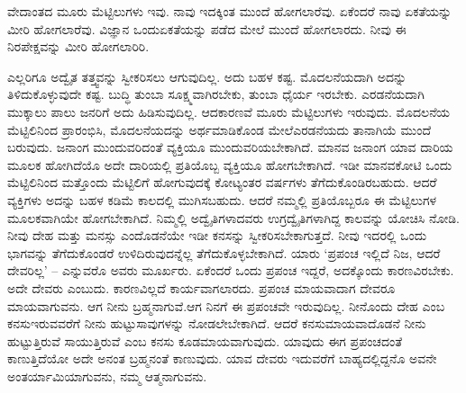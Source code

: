 ವೇದಾಂತದ ಮೂರು ಮೆಟ್ಟಿಲುಗಳು ಇವು. ನಾವು ಇದಕ್ಕಿಂತ ಮುಂದೆ ಹೋಗಲಾರೆವು. ಏಕೆಂದರೆ ನಾವು ಏಕತೆಯನ್ನು ಮೀರಿ ಹೋಗಲಾರೆವು. ವಿಜ್ಞಾನ ಒಂದು\break ಏಕತೆಯನ್ನು ಪಡೆದ ಮೇಲೆ ಮುಂದೆ ಹೋಗಲಾರದು. ನೀವು ಈ ನಿರಪೇಕ್ಷವನ್ನು ಮೀರಿ ಹೋಗಲಾರಿರಿ.

ಎಲ್ಲರಿಗೂ ಅದ್ವೈತ ತತ್ತ್ವವನ್ನು ಸ್ವೀಕರಿಸಲು ಆಗುವುದಿಲ್ಲ. ಅದು ಬಹಳ ಕಷ್ಟ. ಮೊದಲನೆಯದಾಗಿ ಅದನ್ನು ತಿಳಿದುಕೊಳ್ಳುವುದೇ ಕಷ್ಟ. ಬುದ್ಧಿ ತುಂಬಾ ಸೂಕ್ಷ್ಮವಾಗಿರಬೇಕು, ತುಂಬಾ ಧೈರ್ಯ ಇರಬೇಕು. ಎರಡನೆಯದಾಗಿ ಮುಕ್ಕಾಲು ಪಾಲು ಜನರಿಗೆ ಅದು ಹಿಡಿಸುವುದಿಲ್ಲ. ಆದಕಾರಣವೆ ಮೂರು ಮೆಟ್ಟಿಲುಗಳು ಇರುವುದು. ಮೊದಲನೆಯ ಮೆಟ್ಟಿಲಿನಿಂದ ಪ್ರಾರಂಭಿಸಿ, ಮೊದಲನೆಯದನ್ನು ಅರ್ಥಮಾಡಿಕೊಂಡ ಮೇಲೆ\break ಎರಡನೆಯದು ತಾನಾಗಿಯೆ ಮುಂದೆ ಬರುವುದು. ಜನಾಂಗ ಮುಂದುವರಿದಂತೆ ವ್ಯಕ್ತಿಯೂ ಮುಂದುವರಿಯಬೇಕಾಗಿದೆ. ಮಾನವ ಜನಾಂಗ ಯಾವ ದಾರಿಯ ಮೂಲಕ ಹೋಗಿದೆಯೊ ಅದೇ ದಾರಿಯಲ್ಲಿ ಪ್ರತಿಯೊಬ್ಬ ವ್ಯಕ್ತಿಯೂ ಹೋಗಬೇಕಾಗಿದೆ. ಇಡೀ ಮಾನವಕೋಟಿ ಒಂದು ಮೆಟ್ಟಿಲಿನಿಂದ ಮತ್ತೊಂದು ಮೆಟ್ಟಿಲಿಗೆ ಹೋಗುವುದಕ್ಕೆ ಕೋಟ್ಯಂತರ ವರ್ಷಗಳು ತೆಗೆದುಕೊಂಡಿರಬಹುದು. ಆದರೆ ವ್ಯಕ್ತಿಗಳು ಅದನ್ನು ಬಹಳ ಕಡಿಮೆ ಕಾಲದಲ್ಲಿ ಮುಗಿಸಬಹುದು. ಆದರೆ ನಮ್ಮಲ್ಲಿ ಪ್ರತಿಯೊಬ್ಬರೂ ಈ ಮೆಟ್ಟಿಲುಗಳ ಮೂಲಕವಾಗಿಯೇ ಹೋಗಬೇಕಾಗಿದೆ. ನಿಮ್ಮಲ್ಲಿ ಅದ್ವೈತಿಗಳಾದವರು ಉಗ್ರದ್ವೈತಿಗಳಾಗಿದ್ದ ಕಾಲವನ್ನು ಯೋಚಿಸಿ ನೋಡಿ. ನೀವು ದೇಹ ಮತ್ತು ಮನಸ್ಸು ಎಂದೊಡನೆಯೇ ಇಡೀ ಕನಸನ್ನು ಸ್ವೀಕರಿಸಬೇಕಾಗುತ್ತದೆ. ನೀವು ಇದರಲ್ಲಿ ಒಂದು ಭಾಗವನ್ನು ತೆಗೆದುಕೊಂಡರೆ ಉಳಿದಿರುವುದನ್ನೆಲ್ಲ ತೆಗೆದುಕೊಳ್ಳಬೇಕಾಗಿದೆ. ಯಾರು ‘ಪ್ರಪಂಚ ಇಲ್ಲಿದೆ ನಿಜ, ಆದರೆ ದೇವರಿಲ್ಲ’ – ಎನ್ನುವರೊ ಅವರು ಮೂರ್ಖರು. ಏಕೆಂದರೆ ಒಂದು ಪ್ರಪಂಚ ಇದ್ದರೆ, ಅದಕ್ಕೊಂದು ಕಾರಣವಿರಬೇಕು. ಅದೇ ದೇವರು ಎಂಬುದು. ಕಾರಣವಿಲ್ಲದೆ ಕಾರ್ಯವಾಗಲಾರದು. ಪ್ರಪಂಚ ಮಾಯವಾದಾಗ ದೇವರೂ ಮಾಯವಾಗುವನು. ಆಗ ನೀನು ಬ್ರಹ್ಮನಾಗುವೆ.\break ಆಗ ನಿನಗೆ ಈ ಪ್ರಪಂಚವೇ ಇರುವುದಿಲ್ಲ. ನೀನೊಂದು ದೇಹ ಎಂಬ ಕನಸು\break ಇರುವವರೆಗೆ ನೀನು ಹುಟ್ಟುಸಾವುಗಳನ್ನು ನೋಡಲೇಬೇಕಾಗಿದೆ. ಆದರೆ ಕನಸು\break ಮಾಯವಾದೊಡನೆ ನೀನು ಹುಟ್ಟುತ್ತಿರುವೆ ಸಾಯುತ್ತಿರುವೆ ಎಂಬ ಕನಸು ಕೂಡ\break ಮಾಯವಾಗುವುದು. ಯಾವುದು ಈಗ ಪ್ರಪಂಚದಂತೆ ಕಾಣುತ್ತಿದೆಯೋ ಅದೇ ಅನಂತ ಬ್ರಹ್ಮನಂತೆ ಕಾಣುವುದು. ಯಾವ ದೇವರು ಇದುವರೆಗೆ ಬಾಹ್ಯದಲ್ಲಿದ್ದನೊ ಅವನೇ ಅಂತರ್ಯಾಮಿಯಾಗುವನು, ನಮ್ಮ ಆತ್ಮನಾಗುವನು.

